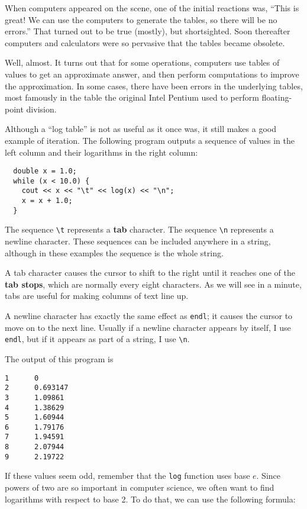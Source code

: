 When computers appeared on the scene, one of the initial reactions
was, ``This is great!  We can use the computers to generate the
tables, so there will be no errors.''  That turned out to be true
(mostly), but shortsighted.  Soon thereafter computers and
calculators were so pervasive that the tables became obsolete.

Well, almost.  It turns out that for some operations, computers
use tables of values to get an approximate answer, and then
perform computations to improve the approximation.  In some
cases, there have been errors in the underlying tables, most
famously in the table the original Intel Pentium used to perform
floating-point division.


Although a ``log table'' is not as useful as it once was, it still
makes a good example of iteration.  The following program outputs a
sequence of values in the left column and their logarithms in the
right column:

\begin{lstlisting}
  double x = 1.0;
  while (x < 10.0) {
    cout << x << "\t" << log(x) << "\n";
    x = x + 1.0;
  }
\end{lstlisting}
%
The sequence \verb+\t+ represents a {\bf tab} character.
The
sequence \verb+\n+ represents a newline character.  These sequences
can be included anywhere in a string, although in these examples
the sequence is the whole string.

A tab character causes the cursor to shift to the right until
it reaches one of the {\bf tab stops}, which are normally every
eight characters.  As we will see in a minute, tabs are useful
for making columns of text line up.

A newline character has exactly the same effect as {\tt endl};
it causes the cursor to move on to the next line.  Usually if
a newline character appears by itself, I use {\tt endl}, but
if it appears as part of a string, I use \verb+\n+.

The output of this program is

\begin{lstlisting}
1      0
2      0.693147
3      1.09861
4      1.38629
5      1.60944
6      1.79176
7      1.94591
8      2.07944
9      2.19722
\end{lstlisting}
%
If these values seem odd, remember that the {\tt log} function uses
base $e$.  Since powers of two are so important in computer science,
we often want to find logarithms with respect to base 2.  To do that,
we can use the following formula:

